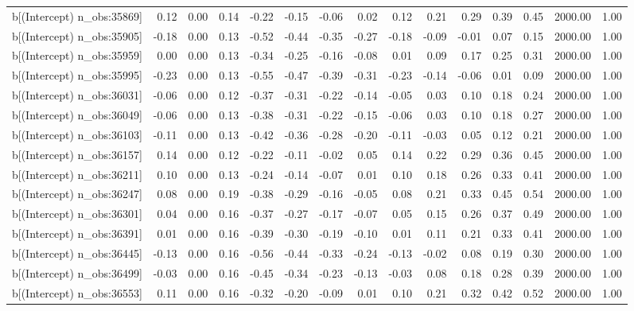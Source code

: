 \begin{table}[ht]
\begin{tabular}{rrrrrrrrrrrrrrr}
  b[(Intercept) n\_obs:35869] & 0.12 & 0.00 & 0.14 & -0.22 & -0.15 & -0.06 & 0.02 & 0.12 & 0.21 & 0.29 & 0.39 & 0.45 & 2000.00 & 1.00 \\ 
  b[(Intercept) n\_obs:35905] & -0.18 & 0.00 & 0.13 & -0.52 & -0.44 & -0.35 & -0.27 & -0.18 & -0.09 & -0.01 & 0.07 & 0.15 & 2000.00 & 1.00 \\ 
  b[(Intercept) n\_obs:35959] & 0.00 & 0.00 & 0.13 & -0.34 & -0.25 & -0.16 & -0.08 & 0.01 & 0.09 & 0.17 & 0.25 & 0.31 & 2000.00 & 1.00 \\ 
  b[(Intercept) n\_obs:35995] & -0.23 & 0.00 & 0.13 & -0.55 & -0.47 & -0.39 & -0.31 & -0.23 & -0.14 & -0.06 & 0.01 & 0.09 & 2000.00 & 1.00 \\ 
  b[(Intercept) n\_obs:36031] & -0.06 & 0.00 & 0.12 & -0.37 & -0.31 & -0.22 & -0.14 & -0.05 & 0.03 & 0.10 & 0.18 & 0.24 & 2000.00 & 1.00 \\ 
  b[(Intercept) n\_obs:36049] & -0.06 & 0.00 & 0.13 & -0.38 & -0.31 & -0.22 & -0.15 & -0.06 & 0.03 & 0.10 & 0.18 & 0.27 & 2000.00 & 1.00 \\ 
  b[(Intercept) n\_obs:36103] & -0.11 & 0.00 & 0.13 & -0.42 & -0.36 & -0.28 & -0.20 & -0.11 & -0.03 & 0.05 & 0.12 & 0.21 & 2000.00 & 1.00 \\ 
  b[(Intercept) n\_obs:36157] & 0.14 & 0.00 & 0.12 & -0.22 & -0.11 & -0.02 & 0.05 & 0.14 & 0.22 & 0.29 & 0.36 & 0.45 & 2000.00 & 1.00 \\ 
  b[(Intercept) n\_obs:36211] & 0.10 & 0.00 & 0.13 & -0.24 & -0.14 & -0.07 & 0.01 & 0.10 & 0.18 & 0.26 & 0.33 & 0.41 & 2000.00 & 1.00 \\ 
  b[(Intercept) n\_obs:36247] & 0.08 & 0.00 & 0.19 & -0.38 & -0.29 & -0.16 & -0.05 & 0.08 & 0.21 & 0.33 & 0.45 & 0.54 & 2000.00 & 1.00 \\ 
  b[(Intercept) n\_obs:36301] & 0.04 & 0.00 & 0.16 & -0.37 & -0.27 & -0.17 & -0.07 & 0.05 & 0.15 & 0.26 & 0.37 & 0.49 & 2000.00 & 1.00 \\ 
  b[(Intercept) n\_obs:36391] & 0.01 & 0.00 & 0.16 & -0.39 & -0.30 & -0.19 & -0.10 & 0.01 & 0.11 & 0.21 & 0.33 & 0.41 & 2000.00 & 1.00 \\ 
  b[(Intercept) n\_obs:36445] & -0.13 & 0.00 & 0.16 & -0.56 & -0.44 & -0.33 & -0.24 & -0.13 & -0.02 & 0.08 & 0.19 & 0.30 & 2000.00 & 1.00 \\ 
  b[(Intercept) n\_obs:36499] & -0.03 & 0.00 & 0.16 & -0.45 & -0.34 & -0.23 & -0.13 & -0.03 & 0.08 & 0.18 & 0.28 & 0.39 & 2000.00 & 1.00 \\ 
  b[(Intercept) n\_obs:36553] & 0.11 & 0.00 & 0.16 & -0.32 & -0.20 & -0.09 & 0.01 & 0.10 & 0.21 & 0.32 & 0.42 & 0.52 & 2000.00 & 1.00 \\ 

\end{tabular}
\end{table}
